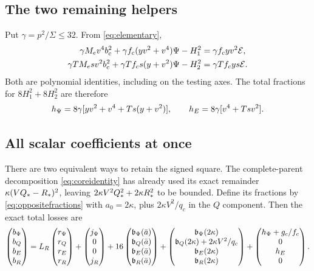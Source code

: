\subsection*{The two remaining helpers}
Put $\gamma=p^2/\Sigma\leq32$. From \eqref{eq:elementary},
\begin{align}
 \gamma M_ev^4b_{\mathrm c}^2+\gamma f_c(yv^2+v^4)\Psi-H_1^2
       &=\gamma f_cyv^2\mathcal E,\notag\\
 \gamma TM_esv^2b_{\mathrm c}^2+\gamma Tf_cs(y+v^2)\Psi-H_2^2
       &=\gamma Tf_cys\mathcal E .
 \label{eq:Hhelpers}
\end{align}
Both are polynomial identities, including on the testing axes.
The total fractions for $8H_1^2+8H_2^2$ are therefore
\[
 h_\Psi=8\gamma[yv^2+v^4+Ts(y+v^2)],\qquad
 h_E=8\gamma[v^4+Tsv^2].
\]

\subsection*{All scalar coefficients at once}
There are two equivalent ways to retain the signed square.
The complete-parent decomposition \eqref{eq:coreidentity} has already
used its exact remainder $\kappa(VQ_*-R_*)^2$, leaving
$2\kappa V^2Q_*^2+2\kappa R_*^2$ to be bounded.
Define its fractions by \eqref{eq:oppositefractions} with $a_0=2\kappa$,
plus $2\kappa V^2/q_c$ in the $Q$ component. Then the exact total losses are
\begin{equation}
 \begin{pmatrix}b_\Psi\\b_Q\\b_E\\b_R\end{pmatrix}
 =
 L_R\begin{pmatrix}r_\Psi\\r_Q\\r_E\\r_R\end{pmatrix}
 +\begin{pmatrix}j_\Psi\\0\\0\\j_R\end{pmatrix}
 +16\begin{pmatrix}\mathfrak b_\Psi(\bar a)\\
                    \mathfrak b_Q(\bar a)\\
                    \mathfrak b_E(\bar a)\\
                    \mathfrak b_R(\bar a)\end{pmatrix}
 +\begin{pmatrix}\mathfrak b_\Psi(2\kappa)\\
 \mathfrak b_Q(2\kappa)+2\kappa V^2/q_c\\
 \mathfrak b_E(2\kappa)\\\mathfrak b_R(2\kappa)\end{pmatrix}
 +\begin{pmatrix}h_\Psi+g_c/f_c\\0\\h_E\\0\end{pmatrix}.
 \label{eq:totallosses}
\end{equation}
